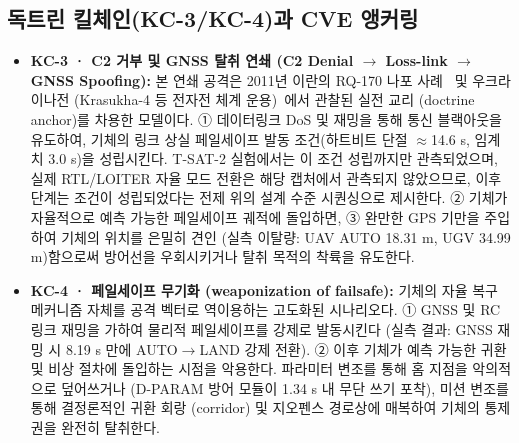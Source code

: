 \subsection{독트린 킬체인(KC-3/KC-4)과 CVE 앵커링}

\begin{center}
\end{center}

\begin{itemize}[leftmargin=*]
    \item \textbf{KC-3 · C2 거부 및 GNSS 탈취 연쇄 (C2 Denial $\to$ Loss-link $\to$ GNSS Spoofing):} 
    본 연쇄 공격은 2011년 이란의 RQ-170 나포 사례~\cite{humphreys_testimony_2012} 및 우크라이나전 (Krasukha-4 등 전자전 체계 운용)~\cite{rusi_russian_airwar_2022}에서 관찰된 실전 교리 (doctrine anchor)를 차용한 모델이다. 
    ① 데이터링크 DoS 및 재밍을 통해 통신 블랙아웃을 유도하여, 기체의 링크 상실 페일세이프 발동 조건(하트비트 단절 $\approx$14.6 s, 임계치 3.0 s)을 성립시킨다. T-SAT-2 실험에서는 이 조건 성립까지만 관측되었으며, 실제 RTL/LOITER 자율 모드 전환은 해당 캡처에서 관측되지 않았으므로, 이후 단계는 조건이 성립되었다는 전제 위의 설계 수준 시퀀싱으로 제시한다. 
    ② 기체가 자율적으로 예측 가능한 페일세이프 궤적에 돌입하면, 
    ③ 완만한 GPS 기만을 주입하여 기체의 위치를 은밀히 견인 (실측 이탈량: UAV AUTO 18.31 m, UGV 34.99 m)함으로써 방어선을 우회시키거나 탈취 목적의 착륙을 유도한다.

    \item \textbf{KC-4 · 페일세이프 무기화 (weaponization of failsafe):} 
    기체의 자율 복구 메커니즘 자체를 공격 벡터로 역이용하는 고도화된 시나리오다. 
    ① GNSS 및 RC 링크 재밍을 가하여 물리적 페일세이프를 강제로 발동시킨다 (실측 결과: GNSS 재밍 시 8.19 s 만에 AUTO$\to$LAND 강제 전환). 
    ② 이후 기체가 예측 가능한 귀환 및 비상 절차에 돌입하는 시점을 악용한다. 파라미터 변조를 통해 홈 지점을 악의적으로 덮어쓰거나 (D-PARAM 방어 모듈이 1.34 s 내 무단 쓰기 포착), 미션 변조를 통해 결정론적인 귀환 회랑 (corridor) 및 지오펜스 경로상에 매복하여 기체의 통제권을 완전히 탈취한다.
\end{itemize}

